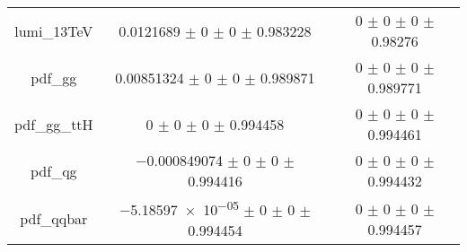\begin{table}
\begin{tabular}{ccc}
lumi\_13TeV & \num{0.0121689} $\pm$ \num{0} $\pm$ \num{0} $\pm$ \num{0.983228} & \num{0} $\pm$ \num{0} $\pm$ \num{0} $\pm$ \num{0.98276}\\
pdf\_gg & \num{0.00851324} $\pm$ \num{0} $\pm$ \num{0} $\pm$ \num{0.989871} & \num{0} $\pm$ \num{0} $\pm$ \num{0} $\pm$ \num{0.989771}\\
pdf\_gg\_ttH & \num{0} $\pm$ \num{0} $\pm$ \num{0} $\pm$ \num{0.994458} & \num{0} $\pm$ \num{0} $\pm$ \num{0} $\pm$ \num{0.994461}\\
pdf\_qg & \num{-0.000849074} $\pm$ \num{0} $\pm$ \num{0} $\pm$ \num{0.994416} & \num{0} $\pm$ \num{0} $\pm$ \num{0} $\pm$ \num{0.994432}\\
pdf\_qqbar & \num{-5.18597e-05} $\pm$ \num{0} $\pm$ \num{0} $\pm$ \num{0.994454} & \num{0} $\pm$ \num{0} $\pm$ \num{0} $\pm$ \num{0.994457}\\
\bottomrule
\end{tabular}
\end{table}